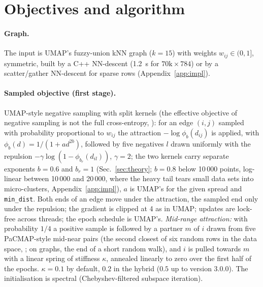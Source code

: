 \documentclass[11pt]{article}
\begin{document}
\section{Objectives and algorithm}\label{sec:algo}
\paragraph{Graph.} The input is UMAP's fuzzy-union kNN graph ($k = 15$) with weights $w_{ij} \in (0, 1]$,
symmetric, built by a C++ NN-descent (1.2~s for $70\mathrm{k} \times 784$) or by a scatter/gather
NN-descent for sparse rows (Appendix~\ref{app:impl}).

\paragraph{Sampled objective (first stage).} UMAP-style negative sampling with split kernels (the
effective objective of negative sampling is not the full cross-entropy, \citealp{damrich2021umap}): for an edge
$(i, j)$ sampled with probability proportional to $w_{ij}$ the attraction $-\log \phi_b(d_{ij})$ is
applied, with $\phi_b(d) = 1/(1 + a d^{2b})$, followed by five negatives $l$ drawn uniformly with the
repulsion $-\gamma \log (1 - \phi_{b_r}(d_{il}))$, $\gamma = 2$; the two kernels carry separate
exponents $b = 0.6$ and $b_r = 1$ (Sec.~\ref{sec:theory}; $b = 0.8$ below 10\,000 points, log-linear between
10\,000 and 20\,000, where the heavy tail tears small data sets into micro-clusters, Appendix~\ref{app:impl}),
$a$ is UMAP's for the given spread and \texttt{min\_dist}. Both ends of an edge move under the attraction, the sampled end only under the
repulsion; the gradient is clipped at 4 as in UMAP; updates are lock-free across threads; the epoch
schedule is UMAP's. \emph{Mid-range attraction:} with probability
$1/4$ a positive sample is followed by a partner $m$ of $i$ drawn from five PaCMAP-style mid-near pairs
(the second closest of six random rows in the data space, \citealp{wang2021pacmap}; on graphs, the end
of a short random walk), and $i$ is pulled towards $m$ with a linear spring of stiffness $\kappa$, annealed
linearly to zero over the first half of the epochs. $\kappa = 0.1$ by default, $0.2$ in the hybrid ($0.5$ up to version 3.0.0). The
initialisation is spectral (Chebyshev-filtered subspace iteration).
\end{document}
